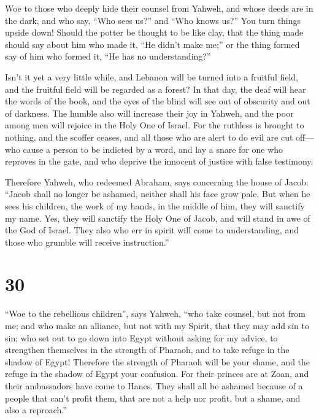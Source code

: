 Woe to those who deeply hide their counsel from Yahweh,
and whose deeds are in the dark, and who say, ``Who sees us?'' and ``Who
knows us?''  You turn things upside down! Should the
potter be thought to be like clay, that the thing made should say about
him who made it, ``He didn't make me;'' or the thing formed say of him
who formed it, ``He has no understanding?''

 Isn't it yet a very little while, and Lebanon will be
turned into a fruitful field, and the fruitful field will be regarded as
a forest?  In that day, the deaf will hear the words of
the book, and the eyes of the blind will see out of obscurity and out of
darkness.  The humble also will increase their joy in
Yahweh, and the poor among men will rejoice in the Holy One of Israel.
 For the ruthless is brought to nothing, and the scoffer
ceases, and all those who are alert to do evil are cut off---
 who cause a person to be indicted by a word, and lay a
snare for one who reproves in the gate, and who deprive the innocent of
justice with false testimony.

 Therefore Yahweh, who redeemed Abraham, says concerning
the house of Jacob: ``Jacob shall no longer be ashamed, neither shall
his face grow pale.  But when he sees his children, the
work of my hands, in the middle of him, they will sanctify my name. Yes,
they will sanctify the Holy One of Jacob, and will stand in awe of the
God of Israel.  They also who err in spirit will come to
understanding, and those who grumble will receive instruction.''

\hypertarget{section-29}{%
\section{30}\label{section-29}}

 ``Woe to the rebellious children'', says Yahweh, ``who
take counsel, but not from me; and who make an alliance, but not with my
Spirit, that they may add sin to sin;  who set out to go
down into Egypt without asking for my advice, to strengthen themselves
in the strength of Pharaoh, and to take refuge in the shadow of Egypt!
 Therefore the strength of Pharaoh will be your shame, and
the refuge in the shadow of Egypt your confusion.  For
their princes are at Zoan, and their ambassadors have come to Hanes.
 They shall all be ashamed because of a people that can't
profit them, that are not a help nor profit, but a shame, and also a
reproach.''

